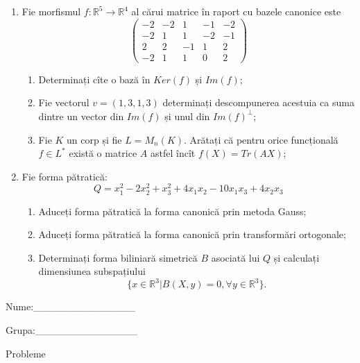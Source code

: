 \documentclass{article}
\begin{document}
\begin{enumerate}
 \item Fie morfismul $f:\mathbb{R}^5 \to \mathbb{R}^4$ al cărui matrice în raport cu bazele canonice este
$$\begin{pmatrix}
-2&-2&1&-1&-2\\
-2&1&1&-2&-1\\
2&2&-1&1&2\\
-2&1&1&0&2
\end{pmatrix}$$

\begin{enumerate}
\item Determinați cîte o bază în $Ker(f)$ și $Im(f)$;
\item Fie vectorul $v=(1,3,1,3)$ determinați descompunerea acestuia ca suma dintre un vector din $Im(f)$ și unul din $Im(f)^\perp$;
\item Fie $K$ un corp și fie $L=M_n(K)$. Arătați că pentru orice funcțională $f \in L^*$ există o matrice $A$ astfel încît $f(X)=Tr(AX)$;
\end{enumerate}
\item Fie forma pătratică:
$$Q= x_1^2-2x_2^2+x_3^2+4x_1x_2-10x_1x_3+4x_2x_3$$

\begin{enumerate}
\item Aduceți forma pătratică la forma canonică prin metoda Gauss;
\item Aduceți forma pătratică la forma canonică prin transformări ortogonale;
\item Determinați forma biliniară simetrică $B$ asociată lui $Q$ și calculați dimensiunea subspațiului
$$\{x \in \mathbb{R}^3 | B(X,y)=0,\forall y \in \mathbb{R}^3\}.$$

\end{enumerate}
\end{enumerate}
\newpage
\begin{flushright}
Nume:\_\_\_\_\_\_\_\_\_\_\_\_\_\_
 
 
Grupa:\_\_\_\_\_\_\_\_\_\_\_\_\_\_
\end{flushright}
\begin{center}
\vspace{2cm}
{\Large Probleme}
\vspace{2cm}
\end{center}
\end{document}
